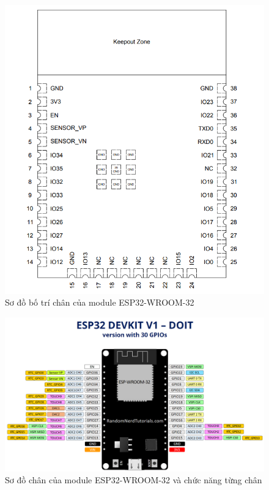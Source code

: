\documentclass[../DoAn.tex]{subfiles}
\begin{document}
\begin{figure}[H]
    \includegraphics[scale = 0.6]{Hinhve/ESP32-Pin-Layout.png}
    \centering
    \caption{Sơ đồ bố trí chân của module ESP32-WROOM-32}
\end{figure}

\begin{figure}[H]
    \includegraphics[scale = 0.6]{Hinhve/ESP32-DOIT-DEVKIT-V1.png}
    \centering
    \caption{Sơ đồ chân của module ESP32-WROOM-32 và chức năng từng chân}
\end{figure}
\end{document}
